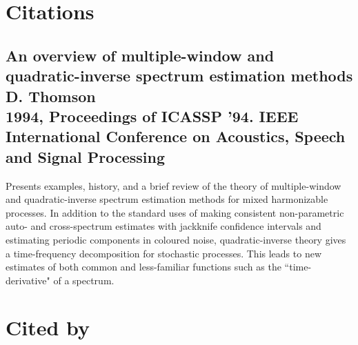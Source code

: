 \documentclass{article}
\begin{document}
{\LARGE\section{Citations}}

\subsection{An overview of multiple-window and quadratic-inverse spectrum estimation methods \\
D. Thomson \\
1994, Proceedings of ICASSP '94. IEEE International Conference on Acoustics, Speech and Signal Processing}
Presents examples, history, and a brief review of the theory of multiple-window and quadratic-inverse spectrum estimation methods for mixed harmonizable processes. In addition to the standard uses of making consistent non-parametric auto- and cross-spectrum estimates with jackknife confidence intervals and estimating periodic components in coloured noise, quadratic-inverse theory gives a time-frequency decomposition for stochastic processes. This leads to new estimates of both common and less-familiar functions such as the ``time-derivative" of a spectrum. \\


{\LARGE\section{Cited by}}
\end{document}
